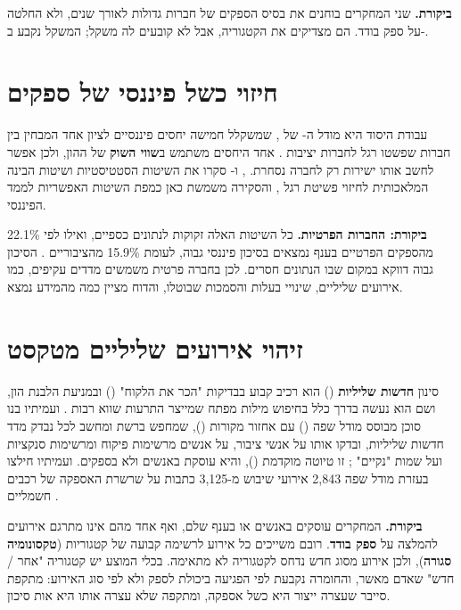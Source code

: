 \textbf{ביקורת.} שני המחקרים בוחנים את בסיס הספקים של חברות גדולות לאורך שנים, ולא החלטה על ספק בודד. הם מצדיקים את הקטגוריה, אבל לא קובעים לה משקל; המשקל נקבע ב-.

\section{חיזוי כשל פיננסי של ספקים}\label{sec:lit-fin}

עבודת היסוד היא מודל ה- של , שמשקלל חמישה יחסים פיננסיים לציון אחד המבחין בין חברות שפשטו רגל לחברות יציבות \cite{altman1968}. אחד היחסים משתמש ב\textbf{שווי השוק} של ההון, ולכן אפשר לחשב אותו ישירות רק לחברה נסחרת. ,  ו- סקרו את השיטות הסטטיסטיות ושיטות הבינה המלאכותית לחיזוי פשיטת רגל \cite{zhaoj2024}, והסקירה משמשת כאן כמפת השיטות האפשריות לממד הפיננסי.

\textbf{ביקורת: החברות הפרטיות.} כל השיטות האלה זקוקות לנתונים כספיים, ואילו לפי  22.1\% מהספקים הפרטיים בענף נמצאים בסיכון פיננסי גבוה, לעומת 15.9\% מהציבוריים \cite{rapidratings2026}. הסיכון גבוה דווקא במקום שבו הנתונים חסרים. לכן בחברה פרטית משמשים מדדים עקיפים, כמו אירועים שליליים, שינויי בעלות והסמכות שבוטלו, והדוח מציין כמה מהמידע נמצא.

\section{זיהוי אירועים שליליים מטקסט}\label{sec:lit-events}

סינון \textbf{חדשות שליליות} () הוא רכיב קבוע בבדיקות "הכר את הלקוח" () ובמניעת הלבנת הון, ושם הוא נעשה בדרך כלל בחיפוש מילות מפתח שמייצר התרעות שווא רבות \cite{chernakov2025}.  ועמיתיו בנו סוכן מבוסס מודל שפה () עם אחזור מקורות (), שמחפש ברשת ומחשב לכל נבדק מדד חדשות שליליות, ובדקו אותו על אנשי ציבור, על אנשים מרשימות פיקוח ומרשימות סנקציות ועל שמות "נקיים" \cite{chernakov2025}; זו טיוטה מוקדמת (), והיא עוסקת באנשים ולא בספקים.  ועמיתיו חילצו בעזרת מודל שפה 2,843 אירועי שיבוש מ-3,125 כתבות על שרשרת האספקה של רכבים חשמליים \cite{zhang2026}.

\textbf{ביקורת.} המחקרים עוסקים באנשים או בענף שלם, ואף אחד מהם אינו מתרגם אירועים להמלצה על \textbf{ספק בודד}. רובם משייכים כל אירוע לרשימה קבועה של קטגוריות (\textbf{טקסונומיה סגורה}), ולכן אירוע מסוג חדש נדחס לקטגוריה לא מתאימה. בכלי המוצע יש קטגוריה "אחר / חדש" שאדם מאשר, והחומרה נקבעת לפי הפגיעה ביכולת לספק ולא לפי סוג האירוע: מתקפת סייבר שעצרה ייצור היא כשל אספקה, ומתקפה שלא עצרה אותו היא אות סיכון.

